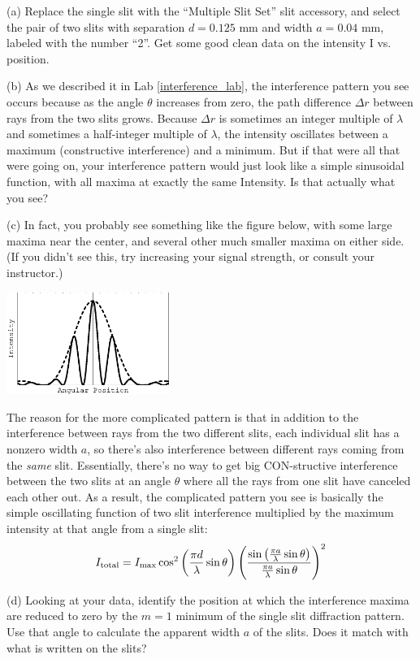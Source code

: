 (a) Replace the single slit with the ``Multiple Slit Set'' slit accessory, and select the pair of two slits with separation $d=0.125$ mm and width $a=0.04$ mm, labeled with the number ``2''.  Get some good clean data on the intensity I vs. position.

(b) As we described it in Lab \ref{interference_lab}, the interference pattern you see occurs because as the angle $\theta$ increases from zero, the path difference $\Delta r$ between rays from the two slits grows.  Because $\Delta r$ is sometimes an integer multiple of $\lambda$ and sometimes a half-integer multiple of $\lambda$, the intensity oscillates between a maximum (constructive interference) and a minimum.  But if that were all that were going on, your interference pattern would just look like a simple sinusoidal function, with all maxima at exactly the same Intensity.  Is that actually what you see?
\answerspace{0.4in}

(c) In fact, you probably see something like the figure below, with some large maxima near the center, and several other much smaller maxima on either side.  (If you didn't see this, try increasing your signal strength, or consult your instructor.)

\begin{center}
\includegraphics[width=0.4\textwidth]{diffraction_of_light/diffraction_of_light_fig_4.eps}
\end{center}

The reason for the more complicated pattern is that in addition to the interference between rays from the two different slits, each individual slit has a nonzero width $a$, so there's also interference between different rays coming from the \textit{same} slit.  Essentially, there's no way to get big CON-structive interference between the two slits at an angle $\theta$ where all the rays from one slit have canceled each other out.  As a result, the complicated pattern you see is basically the simple oscillating function of two slit interference multiplied by the maximum intensity at that angle from a single slit: 
\begin{displaymath} 
I_{\rm{total}} = I_{\rm{max}} \cos^2 \left (\frac {\pi d} {\lambda} \sin \theta \right) \left(\frac {\sin \left (\frac {\pi a} {\lambda} \sin \theta \right )} {\frac {\pi a} {\lambda} \sin \theta} \right)^2 \end{displaymath}

(d) Looking at your data, identify the position at which the interference maxima  are reduced to zero by the $m=1$ minimum of the single slit diffraction pattern.  Use that angle to calculate the apparent width $a$ of the slits.  Does it match with what is written on the slits?
\answerspace{1in}
